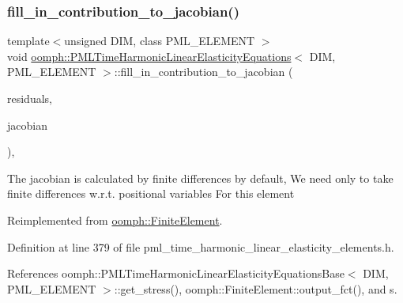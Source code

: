 \subsubsection{\texorpdfstring{fill\+\_\+in\+\_\+contribution\+\_\+to\+\_\+jacobian()}{fill\_in\_contribution\_to\_jacobian()}}
{\footnotesize\ttfamily template$<$unsigned D\+IM, class P\+M\+L\+\_\+\+E\+L\+E\+M\+E\+NT $>$ \\
void \hyperlink{classoomph_1_1PMLTimeHarmonicLinearElasticityEquations}{oomph\+::\+P\+M\+L\+Time\+Harmonic\+Linear\+Elasticity\+Equations}$<$ D\+IM, P\+M\+L\+\_\+\+E\+L\+E\+M\+E\+NT $>$\+::fill\+\_\+in\+\_\+contribution\+\_\+to\+\_\+jacobian (\begin{DoxyParamCaption}\item[{\hyperlink{classoomph_1_1Vector}{Vector}$<$ double $>$ \&}]{residuals,  }\item[{\hyperlink{classoomph_1_1DenseMatrix}{Dense\+Matrix}$<$ double $>$ \&}]{jacobian }\end{DoxyParamCaption})\hspace{0.3cm}{\ttfamily [inline]}, {\ttfamily [virtual]}}

The jacobian is calculated by finite differences by default, We need only to take finite differences w.\+r.\+t. positional variables For this element 

Reimplemented from \hyperlink{classoomph_1_1FiniteElement_a0ae7af222af38a0d53bf283dc85bdfea}{oomph\+::\+Finite\+Element}.



Definition at line 379 of file pml\+\_\+time\+\_\+harmonic\+\_\+linear\+\_\+elasticity\+\_\+elements.\+h.



References oomph\+::\+P\+M\+L\+Time\+Harmonic\+Linear\+Elasticity\+Equations\+Base$<$ D\+I\+M, P\+M\+L\+\_\+\+E\+L\+E\+M\+E\+N\+T $>$\+::get\+\_\+stress(), oomph\+::\+Finite\+Element\+::output\+\_\+fct(), and s.

\mbox{\label{classoomph_1_1PMLTimeHarmonicLinearElasticityEquations_ac4df72a2abd8ce1c7d578d79b4bda828}} 
